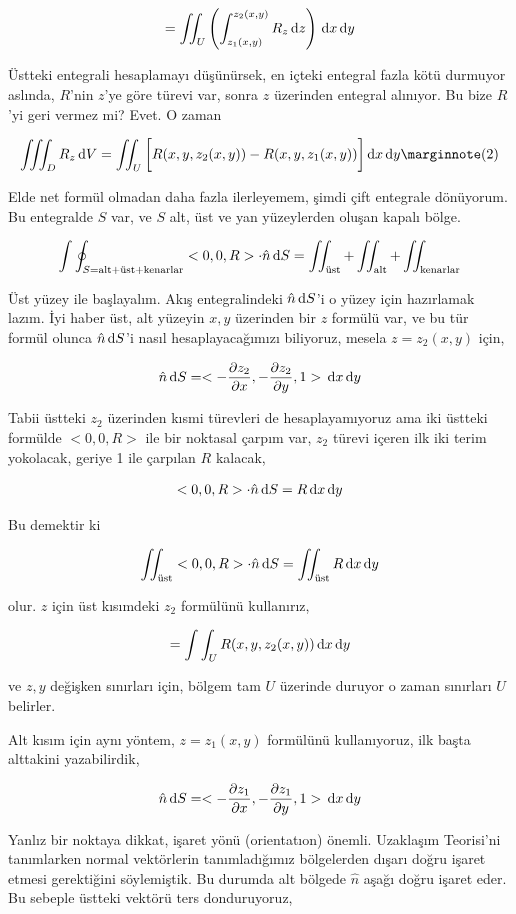 \documentclass[12pt,fleqn]{article}\usepackage{../../common}
\begin{document}
$$
= \iint_U \left( \int_{z_1(x,y)}^{z_2(x,y)} R_z \,\mathrm{d} z  \right) \,\mathrm{d} x \,\mathrm{d} y  
$$

Üstteki entegrali hesaplamayı düşünürsek, en içteki entegral fazla kötü durmuyor
aslında, $R$'nin $z$'ye göre türevi var, sonra $z$ üzerinden entegral alınıyor.
Bu bize $R$'yi geri vermez mi? Evet. O zaman

$$
\iiint_D R_z \ud V = \iint_U \bigg[ R(x,y,z_2(x,y)) - R(x,y,z_1(x,y))  \bigg]
\ud x \ud y
\mlabel{2}
$$

Elde net formül olmadan daha fazla ilerleyemem, şimdi çift entegrale dönüyorum.
Bu entegralde $S$ var, ve $S$ alt, üst ve yan yüzeylerden oluşan kapalı bölge.

$$
\int \oint_{S = \textrm{alt+üst+kenarlar}} < 0,0,R > \cdot \hat{n} \,\mathrm{d} S =
\iint_{\textrm{üst}} + \iint_{\textrm{alt}} + \iint_{\textrm{kenarlar}} 
$$

Üst yüzey ile başlayalım. Akış entegralindeki $\hat{n} \,\mathrm{d} S$'i o yüzey
için hazırlamak lazım. İyi haber üst, alt yüzeyin $x,y$ üzerinden bir $z$
formülü var, ve bu tür formül olunca $\hat{n} \,\mathrm{d} S$'i nasıl hesaplayacağımızı
biliyoruz, mesela $z=z_2(x,y)$ için,

$$
\hat{n} \,\mathrm{d} S =
< -\frac{\partial z_2}{\partial x},
-\frac{\partial z_2}{\partial y},
1 >
\,\mathrm{d} x \,\mathrm{d} y
$$

Tabii üstteki $z_2$ üzerinden kısmi türevleri de hesaplayamıyoruz ama
iki üstteki formülde $< 0,0,R >$ ile bir noktasal çarpım var, $z_2$
türevi içeren ilk iki terim yokolacak, geriye 1 ile çarpılan $R$
kalacak,

$$
< 0,0,R > \cdot \hat{n} \,\mathrm{d} S = R \,\mathrm{d} x \,\mathrm{d} y
$$

Bu demektir ki 

$$
\iint_{\textrm{üst}} < 0,0,R > \cdot \hat{n} \,\mathrm{d} S =
\iint_{\textrm{üst}} R \,\mathrm{d} x \,\mathrm{d} y
$$

olur. $z$ için üst kısımdeki $z_2$ formülünü kullanırız,

$$
= \int \int_U R(x,y,z_2(x,y)) \,\mathrm{d} x \,\mathrm{d} y
$$

ve $z,y$ değişken sınırları için, bölgem tam $U$ üzerinde duruyor o zaman
sınırları $U$ belirler.

Alt kısım için aynı yöntem, $z = z_1(x,y)$ formülünü kullanıyoruz, ilk başta
alttakini yazabilirdik,

$$
\hat{n} \,\mathrm{d} S =
< -\frac{\partial z_1}{\partial x},
-\frac{\partial z_1}{\partial y},
1 >
\,\mathrm{d} x \,\mathrm{d} y
$$

Yanlız bir noktaya dikkat, işaret yönü (orientatıon) önemli. Uzaklaşım
Teorisi'ni tanımlarken normal vektörlerin tanımladığımız bölgelerden dışarı
doğru işaret etmesi gerektiğini söylemiştik. Bu durumda alt bölgede $\hat{n}$
aşağı doğru işaret eder. Bu sebeple üstteki vektörü ters donduruyoruz,
\end{document}
